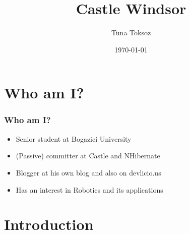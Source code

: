 \documentclass[turkish,handout]{beamer}
\title{Castle Windsor}
\author{Tuna Toksoz}
\date{\today}
\begin{document}
\frame
{
	\titlepage
}

\section[Agenda]{}
\frame{\tableofcontents}
\section{Who am I?}
	\frame
	{
	  \frametitle{Who am I?}
	 	\begin{itemize}
		  \item<1-> Senior student at Bogazici University
		  \item<2-> (Passive) committer at Castle and NHibernate
		  \item<3-> Blogger at his own blog and also on devlicio.us
		  \item<4-> Has an interest in Robotics and its applications
	  \end{itemize}
	}

\section{Introduction}
\end{document}
